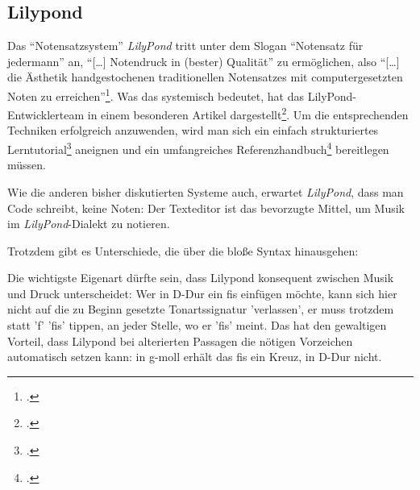 %
%
%



\subsection{Lilypond}

Das \enquote{Notensatzsystem} \emph{LilyPond} tritt unter dem Slogan
\enquote{Notensatz für jedermann} an, \enquote{[\ldots] Notendruck in (bester)
Qualität} zu ermöglichen, also \enquote{[\ldots] die Ästhetik handgestochenen
traditionellen Notensatzes mit computergesetzten Noten zu
erreichen}\footcite[vgl.][\nopage wp]{LilyPond2018x}. Was das systemisch
bedeutet, hat das LilyPond-Entwicklerteam in einem besonderen Artikel
dargestellt\footcite[vgl.][5ff]{LilyPond2018e}. Um die entsprechenden Techniken
erfolgreich anzuwenden, wird man sich ein einfach strukturiertes
Lerntutorial\footcite[vgl.][20ff]{LilyPond2018b} aneignen und ein umfangreiches
Referenzhandbuch\footcite[vgl.][1ff]{LilyPond2018b} bereitlegen müssen.

Wie die anderen bisher diskutierten Systeme auch, erwartet \emph{LilyPond}, dass
man Code schreibt, keine Noten: Der Texteditor ist das bevorzugte Mittel, um
Musik im \emph{LilyPond}-Dialekt zu notieren.

Trotzdem gibt es Unterschiede, die über die bloße Syntax hinausgehen: 

Die wichtigste Eigenart dürfte sein, dass Lilypond konsequent zwischen Musik und
Druck unterscheidet: Wer in D-Dur ein fis einfügen möchte, kann sich hier nicht
auf die zu Beginn gesetzte Tonartssignatur 'verlassen', er muss trotzdem statt
'f' 'fis' tippen, an jeder Stelle, wo er 'fis' meint. Das hat den gewaltigen
Vorteil, dass Lilypond bei alterierten Passagen die nötigen Vorzeichen
automatisch setzen kann: in g-moll erhält das fis ein Kreuz, in D-Dur nicht.

